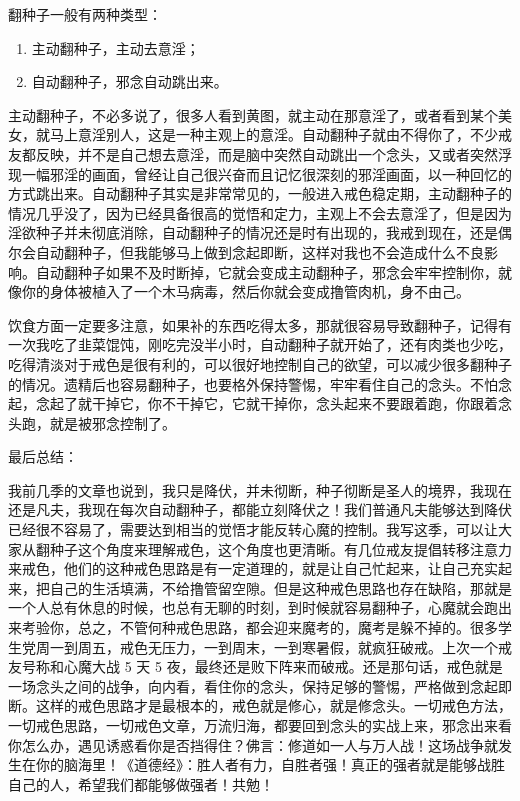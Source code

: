 翻种子一般有两种类型：

\begin{enumerate}
    \item 主动翻种子，主动去意淫；
    \item 自动翻种子，邪念自动跳出来。
\end{enumerate}

主动翻种子，不必多说了，很多人看到黄图，就主动在那意淫了，或者看到某个美女，就马上意淫别人，这是一种主观上的意淫。自动翻种子就由不得你了，不少戒友都反映，并不是自己想去意淫，而是脑中突然自动跳出一个念头，又或者突然浮现一幅邪淫的画面，曾经让自己很兴奋而且记忆很深刻的邪淫画面，以一种回忆的方式跳出来。自动翻种子其实是非常常见的，一般进入戒色稳定期，主动翻种子的情况几乎没了，因为已经具备很高的觉悟和定力，主观上不会去意淫了，但是因为淫欲种子并未彻底消除，自动翻种子的情况还是时有出现的，我戒到现在，还是偶尔会自动翻种子，但我能够马上做到念起即断，这样对我也不会造成什么不良影响。自动翻种子如果不及时断掉，它就会变成主动翻种子，邪念会牢牢控制你，就像你的身体被植入了一个木马病毒，然后你就会变成撸管肉机，身不由己。

饮食方面一定要多注意，如果补的东西吃得太多，那就很容易导致翻种子，记得有一次我吃了韭菜馄饨，刚吃完没半小时，自动翻种子就开始了，还有肉类也少吃，吃得清淡对于戒色是很有利的，可以很好地控制自己的欲望，可以减少很多翻种子的情况。遗精后也容易翻种子，也要格外保持警惕，牢牢看住自己的念头。不怕念起，念起了就干掉它，你不干掉它，它就干掉你，念头起来不要跟着跑，你跟着念头跑，就是被邪念控制了。

最后总结：

我前几季的文章也说到，我只是降伏，并未彻断，种子彻断是圣人的境界，我现在还是凡夫，我现在每次自动翻种子，都能立刻降伏之！我们普通凡夫能够达到降伏已经很不容易了，需要达到相当的觉悟才能反转心魔的控制。我写这季，可以让大家从翻种子这个角度来理解戒色，这个角度也更清晰。有几位戒友提倡转移注意力来戒色，他们的这种戒色思路是有一定道理的，就是让自己忙起来，让自己充实起来，把自己的生活填满，不给撸管留空隙。但是这种戒色思路也存在缺陷，那就是一个人总有休息的时候，也总有无聊的时刻，到时候就容易翻种子，心魔就会跑出来考验你，总之，不管何种戒色思路，都会迎来魔考的，魔考是躲不掉的。很多学生党周一到周五，戒色无压力，一到周末，一到寒暑假，就疯狂破戒。上次一个戒友号称和心魔大战 5 天 5 夜，最终还是败下阵来而破戒。还是那句话，戒色就是一场念头之间的战争，向内看，看住你的念头，保持足够的警惕，严格做到念起即断。这样的戒色思路才是最根本的，戒色就是修心，就是修念头。一切戒色方法，一切戒色思路，一切戒色文章，万流归海，都要回到念头的实战上来，邪念出来看你怎么办，遇见诱惑看你是否挡得住？佛言：修道如一人与万人战！这场战争就发生在你的脑海里！《道德经》：胜人者有力，自胜者强！真正的强者就是能够战胜自己的人，希望我们都能够做强者！共勉！

